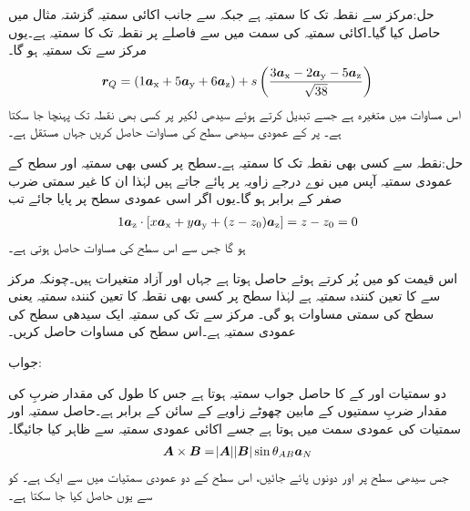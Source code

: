 حل:مرکز  سے  نقطہ  تک کا سمتیہ  ہے جبکہ  سے  جانب اکائی سمتیہ  گزشتہ مثال میں حاصل کیا گیا۔اکائی سمتیہ  کی سمت میں   سے  فاصلے پر نقطہ  تک کا سمتیہ  ہے۔یوں مرکز سے   تک سمتیہ  ہو گا۔
\begin{align*}
{\ensuremath{{\boldsymbol{r}}}}_Q=(1{\boldsymbol{a}}_{\textup{x}}+5{\boldsymbol{a}}_{\textup{y}}+6{\boldsymbol{a}}_{\textup{z}}) +s \left(\frac{3{\boldsymbol{a}}_{\textup{x}}-2{\boldsymbol{a}}_{\textup{y}}-5{\boldsymbol{a}}_{\textup{z}}}{\sqrt{38}}\right)
\end{align*}   
اس مساوات میں  متغیرہ ہے جسے تبدیل کرتے ہوئے سیدھی لکیر پر کسی بھی نقطہ  تک پہنچا جا سکتا ہے۔
 پر  کے عمودی سیدھی سطح کی مساوات حاصل کریں جہاں  مستقل ہے۔ 

حل:نقطہ  سے کسی بھی نقطہ  تک کا سمتیہ  ہے۔سطح پر کسی بھی سمتیہ اور سطح کے عمودی سمتیہ آپس میں نوے درجے زاویہ پر پائے جاتے ہیں لہٰذا ان کا غیر سمتی ضرب صفر کے برابر ہو گا۔یوں اگر  اسی عمودی سطح پر پایا جائے تب
\begin{align*}
1{\boldsymbol{a}}_{\textup{z}} \cdot [x{\boldsymbol{a}}_{\textup{x}}+y{\boldsymbol{a}}_{\textup{y}}+(z-z_0){\boldsymbol{a}}_{\textup{z}}]=z-z_0=0
\end{align*}
ہو گا جس سے اس سطح کی مساوات  حاصل ہوتی ہے۔

اس قیمت کو  میں پُر کرتے ہوئے  حاصل ہوتا ہے جہاں  اور  آزاد متغیرات ہیں۔چونکہ مرکز سے  کا تعین کنندہ سمتیہ  ہے لہٰذا  سطح پر کسی بھی نقطہ  کا تعین کنندہ سمتیہ یعنی سطح کی سمتی مساوات   ہو گی۔
مرکز سے  تک کی سمتیہ ایک سیدھی سطح کی عمودی سمتیہ ہے۔اس سطح کی  مساوات حاصل کریں۔

جواب:

دو سمتیات  اور  کے  کا حاصل جواب سمتیہ ہوتا ہے جس کا طول  کی مقدار ضربِ   کی مقدار ضربِ سمتیوں کے مابین چھوٹے زاویے کے سائن کے برابر ہے۔حاصل سمتیہ  اور  سمتیات کی عمودی سمت  میں ہوتا ہے جسے اکائی عمودی سمتیہ  سے ظاہر کیا جائیگا۔
\begin{align}\label{مساوات_سمتیہ_سمتی_ضرب}
{\ensuremath{{\boldsymbol{A}}}} \times {\ensuremath{{\boldsymbol{B}}}}=\abs{{{\boldsymbol{A}}}} \abs{{{\boldsymbol{B}}}} \sin \theta_{AB} {{\boldsymbol{a}}}_N
\end{align}
جس سیدھی سطح پر  اور  دونوں پائے جائیں،  اس سطح کے دو عمودی سمتیات میں سے ایک ہے۔ کو  سے یوں حاصل کیا جا سکتا ہے۔

